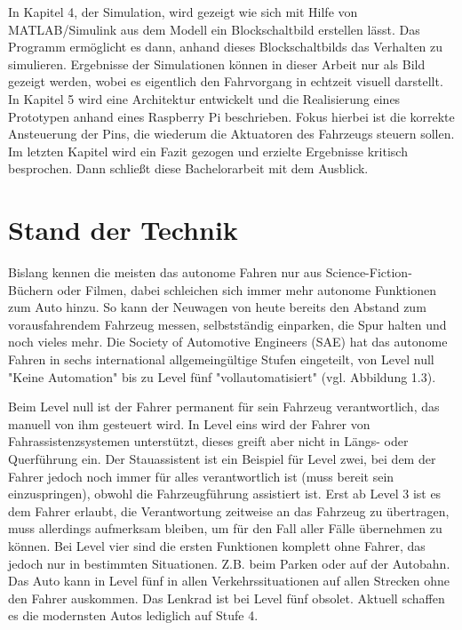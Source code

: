 In Kapitel 4, der Simulation, wird gezeigt wie sich mit Hilfe von MATLAB/Simulink aus dem Modell ein Blockschaltbild erstellen lässt. Das Programm ermöglicht es dann, anhand dieses Blockschaltbilds das Verhalten zu simulieren. Ergebnisse der Simulationen können in dieser Arbeit nur als Bild gezeigt werden, wobei es eigentlich den Fahrvorgang in echtzeit visuell darstellt. In Kapitel 5 wird eine Architektur
entwickelt und die Realisierung eines Prototypen anhand eines Raspberry Pi beschrieben. Fokus hierbei ist die korrekte Ansteuerung der Pins, die wiederum die Aktuatoren des Fahrzeugs steuern sollen.
Im letzten Kapitel wird ein Fazit gezogen und erzielte Ergebnisse kritisch besprochen. Dann schließt diese Bachelorarbeit mit dem Ausblick.


\section{Stand der Technik}
Bislang kennen die meisten das autonome Fahren nur aus Science-Fiction-Büchern oder Filmen, dabei schleichen sich immer mehr autonome Funktionen zum Auto hinzu. So kann der Neuwagen von heute bereits den Abstand zum vorausfahrendem Fahrzeug messen, selbstständig einparken, die Spur halten und noch vieles mehr.
Die Society of Automotive Engineers (SAE) hat das autonome Fahren in sechs international allgemeingültige Stufen eingeteilt, von Level null "Keine Automation" bis zu Level fünf "vollautomatisiert" (vgl. Abbildung 1.3).

Beim Level null ist der Fahrer permanent für sein Fahrzeug verantwortlich, das manuell von ihm gesteuert wird. In Level eins wird der Fahrer von Fahrassistenzsystemen unterstützt, dieses greift aber nicht in Längs- oder Querführung ein. Der Stauassistent ist ein Beispiel für Level zwei, bei dem der Fahrer jedoch noch immer für alles verantwortlich ist (muss bereit sein einzuspringen), obwohl die Fahrzeugführung assistiert ist. Erst ab Level 3 ist es dem Fahrer erlaubt, die Verantwortung zeitweise an das Fahrzeug zu übertragen, muss allerdings aufmerksam bleiben, um für den Fall aller Fälle übernehmen zu können. Bei Level vier sind die ersten Funktionen komplett ohne Fahrer, das jedoch nur in bestimmten Situationen. Z.B. beim Parken oder auf der Autobahn. Das Auto kann in Level fünf in allen Verkehrssituationen auf allen Strecken ohne den Fahrer auskommen. Das Lenkrad ist bei Level fünf obsolet. Aktuell schaffen es die modernsten Autos lediglich auf Stufe 4. \\


